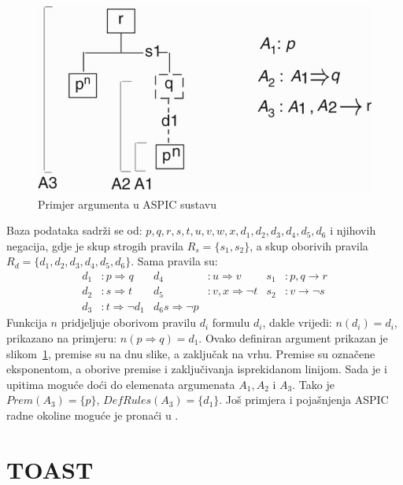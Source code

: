 \begin{figure}
    \includegraphics[scale=0.6]{aspic.jpg}
    \caption{Primjer argumenta u ASPIC sustavu}
\label{fig:aspic}
\end{figure}

Baza podataka sadrži se od:
$p, q, r, s, t, u, v, w, x, d_1, d_2, d_3, d_4, d_5, d_6$ i njihovih negacija, gdje 
je skup strogih pravila $R_s = \{s_1, s_2\}$, a skup oborivih pravila
$R_d = \{d_1, d_2, d_3, d_4, d_5, d_6\}$. Sama pravila su:
\begin{align*}
    d_1&: p \Rightarrow q  &   d_4&: u \Rightarrow v   &    s_1&: p, q \rightarrow r \\
    d_2&: s \Rightarrow t  &   d_5&: v, x \Rightarrow \neg t  &    s_2&: v \rightarrow \neg s \\
    d_3&: t \Rightarrow \neg d_1   & d_6 s \Rightarrow \neg p
\end{align*}
Funkcija $n$ pridjeljuje oborivom pravilu $d_i$ formulu $d_i$, dakle vrijedi:
$n(d_i) = d_i$, prikazano na primjeru: $n(p \Rightarrow q) = d_1$. Ovako definiran argument
prikazan je slikom~\ref{fig:aspic}, premise su na dnu slike, a zaključak na vrhu. Premise
su označene eksponentom, a oborive premise i zaključivanja isprekidanom linijom. 
Sada je i upitima moguće doći do elemenata argumenata $A_1, A_2$ i $A_3$. Tako je
$Prem(A_3) = \{p\}$, $DefRules(A_3) = \{d_1\}$. Još primjera i pojašnjenja ASPIC
radne okoline moguće je pronaći u \citep{modgil2014aspic+}. 

\section{TOAST}

